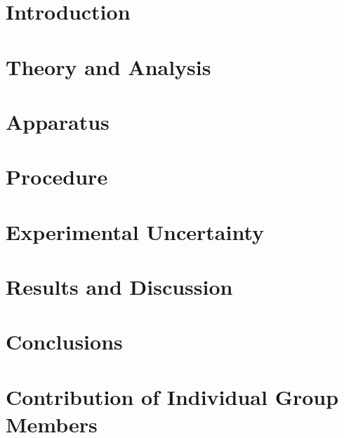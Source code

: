 \documentclass[12pt]{article}
\begin{document}



\newpage


\section{Introduction} \label{sec:1}

\clearpage
\section{Theory and Analysis} \label{sec:2}

\clearpage
\section{Apparatus} \label{sec:3}

\clearpage
\section{Procedure} \label{sec:4}

\clearpage
\section{Experimental Uncertainty} \label{sec:5}

\clearpage
\section{Results and Discussion} \label{sec:6}


\clearpage
\section{Conclusions} \label{sec:7}


\clearpage
\label{sec:8}


% 


\section*{Contribution of Individual Group Members} \label{sec:9}

\end{document}
